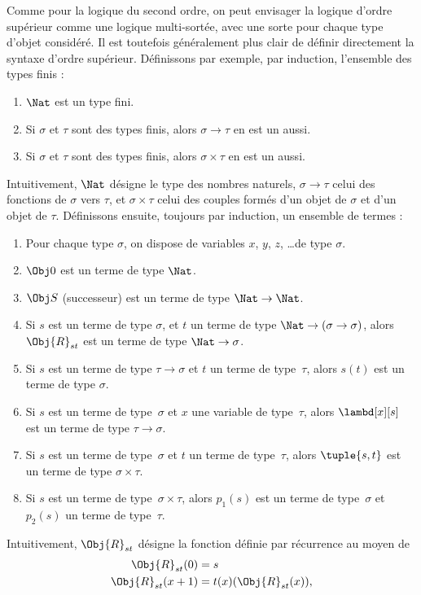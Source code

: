 \documentclass[../../../include/open-logic-section]{subfiles}
\begin{document}
Comme pour la logique du second ordre, on peut envisager la logique
d'ordre supérieur comme une logique multi-sortée, avec une sorte pour
chaque type d'objet considéré. Il est toutefois généralement plus
clair de définir directement la syntaxe d'ordre supérieur. Définissons
par exemple, par induction, l'ensemble des types finis :
\begin{enumerate}
\item $\Nat$ est un type fini.
\item Si $\sigma$ et $\tau$ sont des types finis, alors $\sigma
  \to \tau$ en est un aussi.
\item Si $\sigma$ et $\tau$ sont des types finis, alors $\sigma \times
  \tau$ en est un aussi.
\end{enumerate}
Intuitivement, $\Nat$ désigne le type des nombres naturels,
$\sigma \to \tau$ celui des fonctions de $\sigma$ vers $\tau$, et
$\sigma \times \tau$ celui des couples formés d'un objet de $\sigma$
et d'un objet de $\tau$. Définissons ensuite, toujours par induction,
un ensemble de termes :
\begin{enumerate}
\item Pour chaque type $\sigma$, on dispose de variables $x$, $y$,
  $z$, \dots de type $\sigma$.
\item $\Obj 0$ est un terme de type $\Nat$.
\item $\Obj S$ (successeur) est un terme de type $\Nat \to \Nat$.
\item Si $s$ est un terme de type $\sigma$, et $t$ un terme de type
  $\Nat \to (\sigma \to \sigma)$, alors $\Obj{R}_{st}$ est un terme
  de type $\Nat \to \sigma$.
\item Si $s$ est un terme de type $\tau \to \sigma$ et $t$ un terme
  de type~$\tau$, alors $s(t)$ est un terme de type $\sigma$.
\item Si $s$ est un terme de type~$\sigma$ et $x$ une variable de
  type~$\tau$, alors $\lambd[x][s]$ est un terme de type
  $\tau \to \sigma$.
\item Si $s$ est un terme de type~$\sigma$ et $t$ un terme de
  type~$\tau$, alors $\tuple{s, t}$ est un terme de type
  $\sigma \times \tau$.
\item Si $s$ est un terme de type~$\sigma \times \tau$, alors
  $p_1(s)$ est un terme de type~$\sigma$ et $p_2(s)$ un terme de
  type~$\tau$.
\end{enumerate}
Intuitivement, $\Obj{R}_{st}$ désigne la fonction définie par
récurrence au moyen de
\begin{align*}
\Obj{R}_{st}(0) & = s \\
\Obj{R}_{st}(x+1) & = t(x)(\Obj{R}_{st}(x)),
\end{align*}
\end{document}
